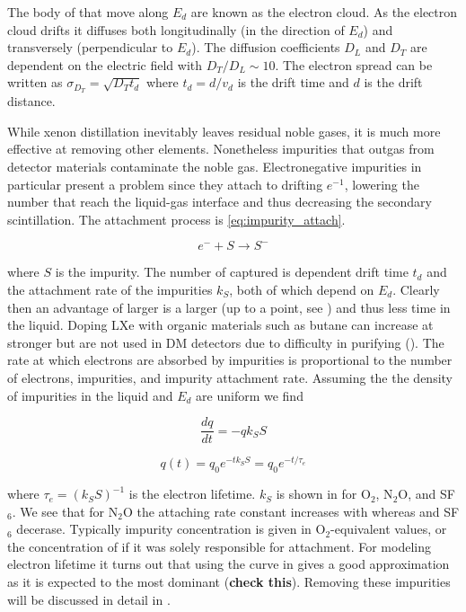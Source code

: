 The body of \electron that move along $E_{d}$ are known as the electron cloud.  As the electron cloud drifts it diffuses both
longitudinally (in the direction of $E_{d}$) and transversely (perpendicular to $E_{d}$).  The
diffusion coefficients $D_{L}$ and $D_{T}$ are dependent on the electric field with $D_{T}/D_{L} \sim 10$.  The electron spread can
be written as $\sigma_{D_{T}} = \sqrt{D_{T} t_{d}}$ where $t_{d} = d/v_{d}$ is the drift time and $d$ is the drift distance.

While xenon distillation inevitably leaves residual noble gases, it is much more effective at removing other elements.  Nonetheless
impurities that outgas from detector materials contaminate the noble gas.  Electronegative impurities in particular present a problem
since they attach to drifting $e^{-1}$,
lowering the number that reach the liquid-gas interface and thus decreasing the secondary scintillation.  The attachment process
is
\eqref{eq:impurity_attach}.

\begin{equation}
e^{-} + S \rightarrow S^{-}
\label{eq:impurity_attach}
\end{equation}

\noindent where $S$ is the impurity.  The number of \electron captured is dependent drift time $t_{d}$ and the
attachment rate of
the impurities $k_{S}$, both of which depend on $E_{d}$.  Clearly then an advantage of larger
\efields is a larger
\vd (up to a point, see ) and thus less time in the liquid.  Doping LXe with organic materials such as butane
can increase \vd at stronger
\efields but are not used in DM detectors due to difficulty in purifying ().  The rate at which electrons are
absorbed by impurities is proportional to the number of electrons, impurities, and impurity attachment rate.  Assuming the the density
of impurities in the liquid and $E_{d}$ are uniform we find

\begin{equation}
\frac{dq}{dt} = -qk_{S}S
\label{eq:lifetime_diff_eq}
\end{equation}

\begin{equation}
q(t) = q_{0}e^{-tk_{S}S} = q_{0}e^{-t/\tau_{e}}
\label{eq:lifetime_equation}
\end{equation}

\noindent where $\tau_{e} = (k_{S}S)^{-1}$ is the electron lifetime.  $k_{S}$ is shown in  for
O$_{2}$,
N$_{2}$O, and SF$_{6}$.  We see that for N$_{2}$O the attaching rate constant increases with \efield whereas \otwo and SF$_{6}$
decerase.  Typically impurity concentration is given in O$_{2}$-equivalent values, or the concentration of \otwo if it was solely
responsible for \electron attachment.  For modeling electron lifetime it turns out that using the \otwo curve in
 gives a good approximation as it is expected to the most dominant (\textbf{check this}).  Removing these
impurities
will be discussed in detail in \secref{}.

